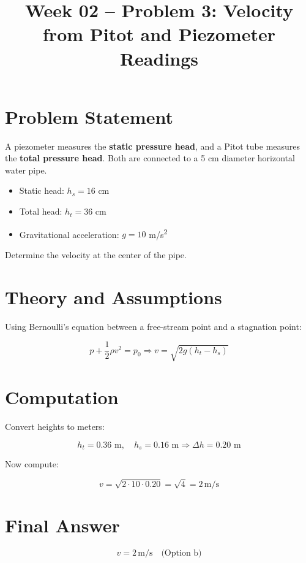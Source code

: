 \documentclass[12pt]{article}
\title{Week 02 -- Problem 3: Velocity from Pitot and Piezometer Readings}
\date{}
\begin{document}
\maketitle

\section*{Problem Statement}

A piezometer measures the \textbf{static pressure head}, and a Pitot tube measures the \textbf{total pressure head}. Both are connected to a 5 cm diameter horizontal water pipe.

\begin{itemize}
    \item Static head: $h_s = 16$ cm
    \item Total head: $h_t = 36$ cm
    \item Gravitational acceleration: $g = 10$ m/s\textsuperscript{2}
\end{itemize}

Determine the velocity at the center of the pipe.

\section*{Theory and Assumptions}

Using Bernoulli’s equation between a free-stream point and a stagnation point:

\[
p + \frac{1}{2} \rho v^2 = p_0
\Rightarrow
v = \sqrt{2g(h_t - h_s)}
\]

\section*{Computation}

Convert heights to meters:

\[
h_t = 0.36 \text{ m}, \quad h_s = 0.16 \text{ m}
\Rightarrow \Delta h = 0.20 \text{ m}
\]

Now compute:

\[
v = \sqrt{2 \cdot 10 \cdot 0.20} = \sqrt{4} = 2 \, \text{m/s}
\]

\section*{Final Answer}

\[
\boxed{v = 2 \, \text{m/s}} \quad \text{(Option b)}
\]
\end{document}
